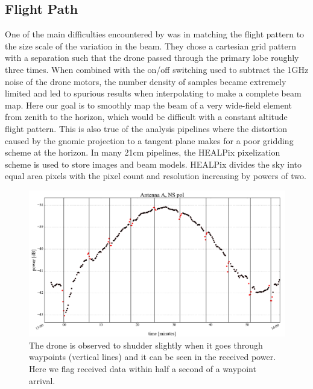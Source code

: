 \documentclass[preprint2,numberedappendix,tighten,twocolappendix]{aastex6}
\begin{document}
\subsection{Flight Path}
One of the main difficulties encountered by \citet{2015PASP..127.1131C} was in matching the flight pattern to the size scale of the variation in the beam.  They chose a cartesian grid pattern with a separation such that the drone passed through the primary lobe roughly three times.  When combined with the on/off switching used to subtract the 1GHz noise of the drone motors, the number density of samples became extremely limited and led to spurious results when interpolating to make a complete beam map.  Here our goal is to smoothly map the beam of a very wide-field element from zenith to the horizon, which would be difficult with a constant altitude flight pattern.  This is also true of the analysis pipelines where the distortion caused by the gnomic projection to a tangent plane makes for a poor gridding scheme at the horizon. In many 21cm pipelines, the HEALPix pixelization scheme \citep{Gorski:2005p7667} is used to store images and beam models.  HEALPix divides the sky into equal area pixels with the pixel count and resolution increasing by powers of two.

\begin{figure}[htb]
\includegraphics[width=\columnwidth]{figures/GB_waypoint_flagging_zoom.png}
\caption{The drone is observed to shudder slightly when it goes through waypoints (vertical lines) and it can be seen in the received power. Here we flag received data within half a second of a waypoint arrival.}
\label{fig:waypoint_flagging}
\end{figure}
\end{document}
